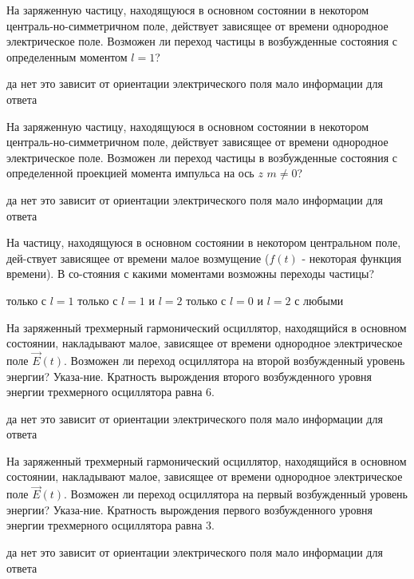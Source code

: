 \documentclass[11pt,a4paper]{exam}
\begin{document}
\begin{questions}
\question На заряженную частицу, находящуюся в основном состоянии в некотором централь-но-симметричном поле, действует зависящее от времени однородное электрическое поле. Возможен ли переход частицы в возбужденные состояния с определенным моментом $l = 1$? 
\begin{choices}
\choice да
\choice нет      
\choice это зависит от ориентации электрического поля
\choice мало информации для ответа
\end{choices}

\question На заряженную частицу, находящуюся в основном состоянии в некотором централь-но-симметричном поле, действует зависящее от времени однородное электрическое поле. Возможен ли переход частицы в возбужденные состояния с определенной проекцией момента импульса на ось $z$ $m \ne 0$? 
\begin{choices}
\choice да
\choice нет      
\choice это зависит от ориентации электрического поля
\choice мало информации для ответа
\end{choices}

\question На частицу, находящуюся в основном состоянии в некотором центральном поле, дей-ствует зависящее от времени малое возмущение  ($f(t)$ - некоторая функция времени). В со-стояния с какими моментами возможны переходы частицы? 
\begin{choices}
\choice только с $l = 1$     
\choice только с $l = 1$ и $l = 2$
\choice только с $l = 0$ и $l = 2$ 
\choice с любыми
\end{choices}

\question На заряженный трехмерный гармонический осциллятор, находящийся в основном состоянии, накладывают малое, зависящее от времени однородное электрическое поле $\vec E(t)$. Возможен ли переход осциллятора на второй возбужденный уровень энергии? Указа-ние. Кратность вырождения второго возбужденного уровня энергии трехмерного осциллятора равна 6.
\begin{choices}
\choice да
\choice нет
\choice это зависит от ориентации электрического поля
\choice мало информации для ответа
\end{choices}

\question На заряженный трехмерный гармонический осциллятор, находящийся в основном состоянии, накладывают малое, зависящее от времени однородное электрическое поле $\vec E(t)$. Возможен ли переход осциллятора на первый возбужденный уровень энергии? Указа-ние. Кратность вырождения первого возбужденного уровня энергии трехмерного осциллятора равна 3.
\begin{choices}
\choice да
\choice нет
\choice это зависит от ориентации электрического поля
\choice мало информации для ответа
\end{choices}


\end{questions}
\end{document}
